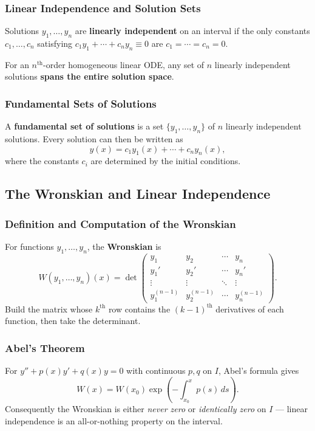 \documentclass[10pt]{article}
\newcommand{\m}[1]{$#1$}
\begin{document}
    \subsubsection{Linear Independence and Solution Sets}
    Solutions \m{y_1, \ldots, y_n} are \textbf{linearly independent} on an interval if the only
    constants \m{c_1, \ldots, c_n} satisfying \m{c_1 y_1 + \cdots + c_n y_n \equiv 0} are
    \m{c_1 = \cdots = c_n = 0}.

    For an \m{n^{\text{th}}}-order homogeneous linear ODE, any set of \m{n} linearly independent
    solutions \textbf{spans the entire solution space}.

    \subsubsection{Fundamental Sets of Solutions}
    A \textbf{fundamental set of solutions} is a set \m{\{y_1, \ldots, y_n\}} of \m{n} linearly
    independent solutions. Every solution can then be written as
    \[
        y(x) = c_1 y_1(x) + \cdots + c_n y_n(x),
    \]
    where the constants \m{c_i} are determined by the initial conditions.

\subsection{The Wronskian and Linear Independence}

    \subsubsection{Definition and Computation of the Wronskian}
    For functions \m{y_1, \ldots, y_n}, the \textbf{Wronskian} is
    \[
        W(y_1, \ldots, y_n)(x) = \det\!\begin{pmatrix}
            y_1         & y_2         & \cdots & y_n         \\
            y_1'        & y_2'        & \cdots & y_n'        \\
            \vdots      & \vdots      & \ddots & \vdots      \\
            y_1^{(n-1)} & y_2^{(n-1)} & \cdots & y_n^{(n-1)}
        \end{pmatrix}.
    \]
    Build the matrix whose \m{k^{\text{th}}} row contains the \m{(k-1)^{\text{th}}} derivatives of
    each function, then take the determinant.

    \subsubsection{Abel's Theorem}
    For \m{y'' + p(x)y' + q(x)y = 0} with continuous \m{p, q} on \m{I}, Abel's formula gives
    \[
        W(x) = W(x_0)\exp\!\left(-\int_{x_0}^{x} p(s)\,ds\right).
    \]
    Consequently the Wronskian is either \emph{never zero} or \emph{identically zero} on \m{I} ---
    linear independence is an all-or-nothing property on the interval.
\end{document}
